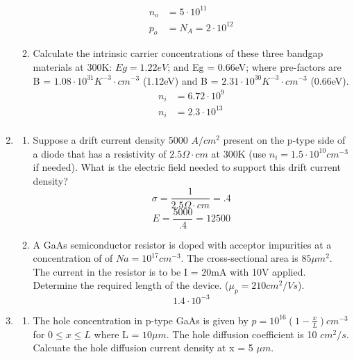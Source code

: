 \documentclass{article}
\begin{document}
\begin{enumerate}
\begin{enumerate}
    \begin{align}
        n_o &= 5 \cdot 10^{11}\\
        p_o &=  N_A =  2 \cdot 10^{12}
    \end{align}
    \item Calculate the intrinsic carrier concentrations of these three bandgap materials at 300K: $Eg = 1.22eV$; and Eg = 0.66eV; where pre-factors are B = $1.08\cdot10^{31} K^{-3}\cdot cm^{-3}$ (1.12eV) and B = $2.31\cdot10^{30} K^{-3} \cdot cm^{-3}$ (0.66eV).
    \begin{align}
        n_i &= 6.72 \cdot 10^{9}\\
        n_i &= 2.3 \cdot 10^{13}\\
    \end{align}
\end{enumerate}
\newpage
\item
\begin{enumerate}
    \item Suppose a drift current density 5000 $A/cm^2$ present on the p-type side of a diode that has a resistivity of $2.5 \Omega\cdot cm$ at 300K (use $n_i = 1.5\cdot10^{10}cm^{-3}$ if needed). What is the electric field needed to support this drift current density?
    \begin{equation}
        \sigma = \frac{1}{2.5\Omega\cdot cm} = .4
    \end{equation}
    \begin{equation}
        E = \frac{5000}{.4} = 12500 
    \end{equation}
    \item A GaAs semiconductor resistor is doped with acceptor impurities at a concentration of of $Na = 10^{17}cm^{-3}$.  The cross-sectional area is $85\mu m^2$.  The current in the resistor is to be I = 20mA with 10V applied.  Determine the required length of the device. ($\mu_ p = 210 cm^2/Vs$).
    \begin{equation}
        1.4\cdot 10^{-3}
    \end{equation}
\end{enumerate}
\newpage
\item 
\begin{enumerate}
    \item The hole concentration in p-type GaAs is given by $p = 10^{16}\left(1 - \frac{x}{L}\right)cm^{-3}$ for $0 \leq x \leq L$ where L = $10\mu m$. The hole diffusion coefficient is 10 $cm^2/s$. Calcuate the hole diffusion current density at x = 5 $\mu m$. 
    \begin{align}

\end{align}
\end{enumerate}
\end{enumerate}
\end{document}
